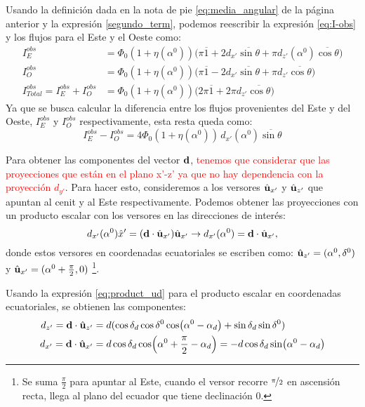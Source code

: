      Usando la definición dada en la nota de pie \ref{eq:media_angular} de la página anterior y la expresión \ref{segundo_term}, podemos reescribir la expresión \ref{eq:I-obs} y los flujos para el Este y el Oeste como:
    \begin{align*}
    I^{obs}_E&= \Phi_0 (1+ \eta(\alpha^0)) \Big( \pi\overline{1} + 2d_{x'}\overline{\sin\theta} + \pi d_{z'}(\alpha^0)\overline{\cos\theta}  \Big) \\
        I^{obs}_O&= \Phi_0 (1+ \eta(\alpha^0)) \Big( \pi \overline{1} - 2d_{x'}\overline{\sin\theta}   + \pi d_{z'}\overline{\cos\theta} \Big) \\
        I_{Total}^{obs}=I^{obs}_E +I^{obs}_O &= \Phi_0 (1+ \eta(\alpha^0)) \Big( 2\pi\overline{1} +2\pi d_{z'}\overline{\cos\theta}  \Big)
    \end{align*}
    Ya que se busca calcular la diferencia entre los flujos provenientes del Este y del Oeste, $I^{obs}_E $ y $  I^{obs}_O $ respectivamente, esta resta queda como:
    \begin{equation*}
        I^{obs}_E -  I^{obs}_O = 4 \Phi_0 (1+ \eta(\alpha^0)) \,  d_{x'}(\alpha^0)\overline{\sin\theta}
    \end{equation*}

    Para obtener las componentes del vector $\bf{d}$, \textcolor{red}{tenemos que considerar que las proyecciones que están en el plano x'-z' ya que no hay dependencia con la proyección $d_{y'}$}. Para hacer esto, consideremos a los versores $\hat{\bf{u}}_{x'}$ y $\hat{\bf{u}}_{z'}$ que apuntan al cenit y al Este respectivamente. Podemos obtener las proyecciones con un producto escalar con los versores en las direcciones de interés:
    \begin{equation}
        d_{x'}(\alpha^0) \hat{x}' =  (\textbf{d}\cdot\hat{\bf{u}}_{x'})\hat{\bf{u}}_{x'} \rightarrow d_{x'}(\alpha^0) = \textbf{d}\cdot\hat{\bf{u}}_{x'},
    \end{equation}
    donde estos versores en coordenadas ecuatoriales se escriben como:
    $\hat{\bf{u}}_{z'}= (\alpha^0,\delta^0 )$ y $ \hat{\bf{u}}_{x'} = (\alpha^0 + \frac{\pi}{2},0)$ \footnote{Se suma  $\frac{\pi}{2}$ para apuntar al Este, cuando el versor recorre $\nicefrac{\pi}{2}$ en ascensión recta, llega al plano del ecuador que tiene declinación $0$.}.

    Usando la expresión \ref{eq:product_ud} para el producto escalar en coordenadas ecuatoriales, se obtienen las componentes:
    \begin{align}
        d_{z'}=\textbf{d}\cdot\hat{\bf{u}}_{z'} &= d (\cos\delta_d \cos\delta^0 \cos(\alpha^0 - \alpha_d) + \sin\delta_d  \sin\delta^0)\\
        d_{x'}=\textbf{d}\cdot\hat{\bf{u}}_{x'} &= d \cos\delta_d \cos(\alpha^0 +\frac{\pi}{2} - \alpha_d) 
        = -d\cos\delta_d \sin(\alpha^0  - \alpha_d) \label{eq:total_flux_eta}
    \end{align}
    
